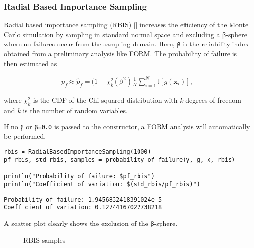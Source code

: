 \subsubsection{Radial Based Importance Sampling}



\label{2106574880283869235}{}


Radial based importance sampling (RBIS) [] increases the efficiency of the Monte Carlo simulation by sampling in standard normal space and excluding a β-sphere where no failures occur from the sampling domain. Here, \texttt{β} is the reliability index obtained from a preliminary analysis like FORM. The probability of failure is then estimated as



\begin{equation*}
\begin{split}p_f \approx \hat{p}_f = (1- \chi^2_k(\beta^2) \frac{1}{N} \sum_{i=1}^N \mathbb{I}[g(\boldsymbol{x}_i)],\end{split}\end{equation*}


where \(\chi^2_k\) is the CDF of the Chi-squared distribution with \(k\) degrees of freedom and \(k\) is the number of random variables.



If no \texttt{β} or \texttt{β=0.0} is passed to the  constructor, a FORM analysis will automatically be performed.




\begin{verbatim}
rbis = RadialBasedImportanceSampling(1000)
pf_rbis, std_rbis, samples = probability_of_failure(y, g, x, rbis)

println("Probability of failure: $pf_rbis")
println("Coefficient of variation: $(std_rbis/pf_rbis)")
\end{verbatim}


\begin{verbatim}
Probability of failure: 1.9456832418391024e-5
Coefficient of variation: 0.12744167022738218
\end{verbatim}



A scatter plot clearly shows the exclusion of the β-sphere. \begin{figure}
\centering
\caption{RBIS samples}
\end{figure}




